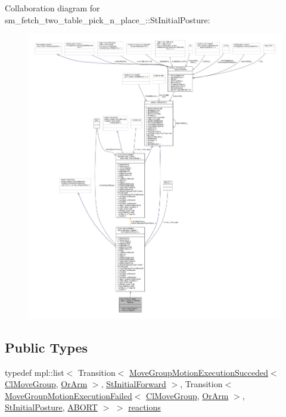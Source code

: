 Collaboration diagram for sm\+\_\+fetch\+\_\+two\+\_\+table\+\_\+pick\+\_\+n\+\_\+place\+\_\+:\+:St\+Initial\+Posture\+:
\nopagebreak
\begin{figure}[H]
\begin{center}
\leavevmode
\includegraphics[width=350pt]{structsm__fetch__two__table__pick__n__place__1_1_1StInitialPosture__coll__graph}
\end{center}
\end{figure}
\subsection*{Public Types}
\begin{DoxyCompactItemize}
\item 
typedef mpl\+::list$<$ Transition$<$ \hyperlink{structmove__group__interface__client_1_1MoveGroupMotionExecutionSucceded}{Move\+Group\+Motion\+Execution\+Succeded}$<$ \hyperlink{classmove__group__interface__client_1_1ClMoveGroup}{Cl\+Move\+Group}, \hyperlink{classsm__fetch__two__table__pick__n__place__1_1_1OrArm}{Or\+Arm} $>$, \hyperlink{structsm__fetch__two__table__pick__n__place__1_1_1StInitialForward}{St\+Initial\+Forward} $>$, Transition$<$ \hyperlink{structmove__group__interface__client_1_1MoveGroupMotionExecutionFailed}{Move\+Group\+Motion\+Execution\+Failed}$<$ \hyperlink{classmove__group__interface__client_1_1ClMoveGroup}{Cl\+Move\+Group}, \hyperlink{classsm__fetch__two__table__pick__n__place__1_1_1OrArm}{Or\+Arm} $>$, \hyperlink{structsm__fetch__two__table__pick__n__place__1_1_1StInitialPosture}{St\+Initial\+Posture}, \hyperlink{classABORT}{A\+B\+O\+RT} $>$ $>$ \hyperlink{structsm__fetch__two__table__pick__n__place__1_1_1StInitialPosture_a5f6d4f675c40feb34ba0c8aa337a56a0}{reactions}
\end{DoxyCompactItemize}
